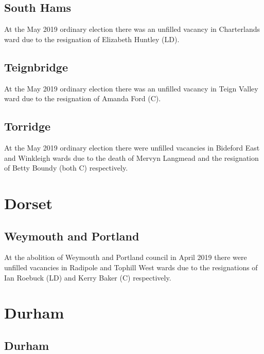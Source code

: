\documentclass[a4paper,openany]{book}
\begin{document}
\begin{resultsiii}
\subsection*{South Hams}

At the May 2019 ordinary election there was an unfilled vacancy in Charterlands ward due to the resignation of Elizabeth Huntley (LD).

\subsection*{Teignbridge}

At the May 2019 ordinary election there was an unfilled vacancy in Teign Valley ward due to the resignation of Amanda Ford (C).

\subsection*{Torridge}

At the May 2019 ordinary election there were unfilled vacancies in Bideford East and Winkleigh wards due to the death of Mervyn Langmead and the resignation of Betty Boundy (both C) respectively.

\section{Dorset}

\subsection*{Weymouth and Portland}

At the abolition of Weymouth and Portland council in April 2019 there were unfilled vacancies in Radipole and Tophill West wards due to the resignations of Ian Roebuck (LD) and Kerry Baker (C) respectively.

\section{Durham}

\subsection*{Durham}


\end{resultsiii}
\end{document}

